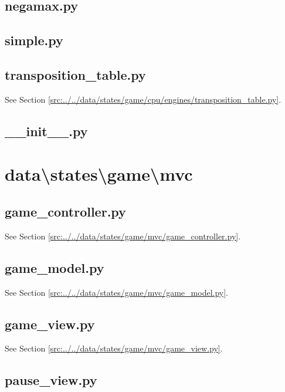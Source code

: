 \documentclass[../main/main.tex]{subfiles}
\begin{document}
\subsection{negamax.py}

\label{src:data/states/game/cpu/engines/negamax.py}

\subsection{simple.py}

\label{src:data/states/game/cpu/engines/simple.py}

\subsection{transposition\_table.py}
See Section \ref{src:../../data/states/game/cpu/engines/transposition_table.py}.

\subsection{\_\_init\_\_.py}

\label{src:data/states/game/cpu/engines/__init__.py}

\section{data\textbackslash states\textbackslash game\textbackslash mvc}
\subsection{game\_controller.py}
See Section \ref{src:../../data/states/game/mvc/game_controller.py}.

\subsection{game\_model.py}
See Section \ref{src:../../data/states/game/mvc/game_model.py}.

\subsection{game\_view.py}
See Section \ref{src:../../data/states/game/mvc/game_view.py}.

\subsection{pause\_view.py}

\label{src:data/states/game/mvc/pause_view.py}
\end{document}
